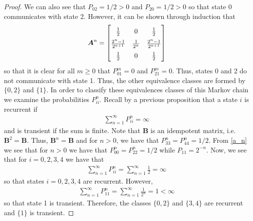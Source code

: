 \begin{proof}
  We can also see that $P_{02} = 1/2 > 0$ and $P_{20} = 1/2 > 0$ so that state 0 communicates with state 2.
  However, it can be shown through induction that
  \begin{align}\label{a_n}
    \renewcommand\arraystretch{1.5}
    \boldsymbol{A}^n =
    \begin{bmatrix}
      \frac{1}{2}           & 0             & \frac{1}{2} \\
      \frac{2^{n}-1}{2^{n+1}} & \frac{1}{2^n} & \frac{2^{n}-1}{2^{n+1}} \\
      \frac{1}{2}           & 0             & \frac{1}{2}
    \end{bmatrix}
  \end{align}
  so that it is clear for all $m\geq 0$ that $P_{01}^m = 0$ and $P_{21}^m = 0$. Thus,
  states 0 and 2 do not communicate with state 1. Thus, the other equivalence classes are formed
  by $\{0, 2\}$ and $\{1\}$. In order to classify these equivalences classes
  of this Markov chain we examine the probabilities $P_{ii}^n$. Recall by a previous proposition that a state
  $i$ is recurrent if
  \begin{align*}
    \sum_{n=1}^{\infty} P_{ii}^n = \infty
  \end{align*}
  and is transient if the sum is finite. Note that $\boldsymbol{B}$ is an idempotent
  matrix, i.e.\ $\boldsymbol{B}^2 = \boldsymbol{B}$. Thus, $\boldsymbol{B}^n = \boldsymbol{B}$ and for $n > 0$, we have
  that $P_{33}^n = P_{44}^n = 1/2$. From \eqref{a_n} we see that for $n > 0$ we have that
  $P_{00}^n = P_{22}^n = 1/2$ while $P_{11} = 2^{-n}$. Now,
  we see that for $i=0,2,3,4$ we have that
  \begin{align*}
    \sum_{n=1}^{\infty} P_{ii}^n = \sum_{n=1}^{\infty} \frac{1}{2} = \infty
  \end{align*}
  so that states $i=0,2,3,4$ are recurrent. However,
  \begin{align*}
    \sum_{n=1}^{\infty} P_{11}^n = \sum_{n=1}^{\infty} \frac{1}{2^n} = 1 < \infty
  \end{align*}
  so that state 1 is transient. Therefore, the classes $\{0, 2\}$ and $\{3, 4\}$
  are recurrent and $\{1\}$ is transient.


\end{proof}
